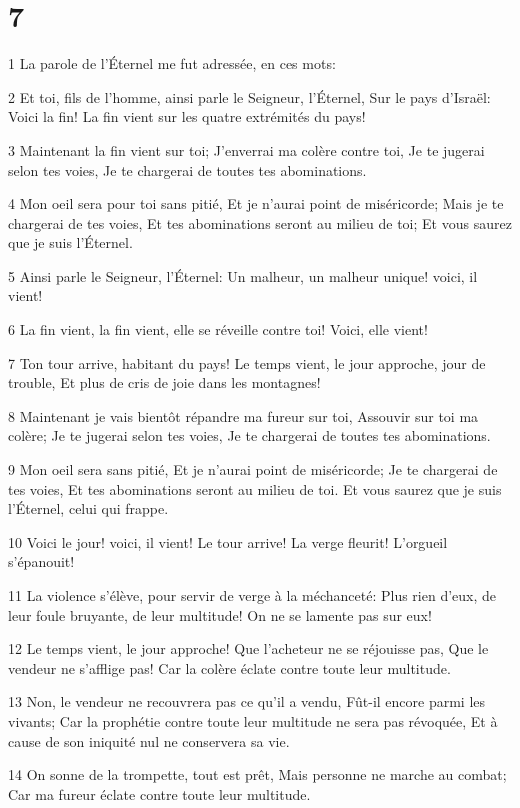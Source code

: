 \chapter{7}

\par 1 La parole de l'Éternel me fut adressée, en ces mots:
\par 2 Et toi, fils de l'homme, ainsi parle le Seigneur, l'Éternel, Sur le pays d'Israël: Voici la fin! La fin vient sur les quatre extrémités du pays!
\par 3 Maintenant la fin vient sur toi; J'enverrai ma colère contre toi, Je te jugerai selon tes voies, Je te chargerai de toutes tes abominations.
\par 4 Mon oeil sera pour toi sans pitié, Et je n'aurai point de miséricorde; Mais je te chargerai de tes voies, Et tes abominations seront au milieu de toi; Et vous saurez que je suis l'Éternel.
\par 5 Ainsi parle le Seigneur, l'Éternel: Un malheur, un malheur unique! voici, il vient!
\par 6 La fin vient, la fin vient, elle se réveille contre toi! Voici, elle vient!
\par 7 Ton tour arrive, habitant du pays! Le temps vient, le jour approche, jour de trouble, Et plus de cris de joie dans les montagnes!
\par 8 Maintenant je vais bientôt répandre ma fureur sur toi, Assouvir sur toi ma colère; Je te jugerai selon tes voies, Je te chargerai de toutes tes abominations.
\par 9 Mon oeil sera sans pitié, Et je n'aurai point de miséricorde; Je te chargerai de tes voies, Et tes abominations seront au milieu de toi. Et vous saurez que je suis l'Éternel, celui qui frappe.
\par 10 Voici le jour! voici, il vient! Le tour arrive! La verge fleurit! L'orgueil s'épanouit!
\par 11 La violence s'élève, pour servir de verge à la méchanceté: Plus rien d'eux, de leur foule bruyante, de leur multitude! On ne se lamente pas sur eux!
\par 12 Le temps vient, le jour approche! Que l'acheteur ne se réjouisse pas, Que le vendeur ne s'afflige pas! Car la colère éclate contre toute leur multitude.
\par 13 Non, le vendeur ne recouvrera pas ce qu'il a vendu, Fût-il encore parmi les vivants; Car la prophétie contre toute leur multitude ne sera pas révoquée, Et à cause de son iniquité nul ne conservera sa vie.
\par 14 On sonne de la trompette, tout est prêt, Mais personne ne marche au combat; Car ma fureur éclate contre toute leur multitude.

